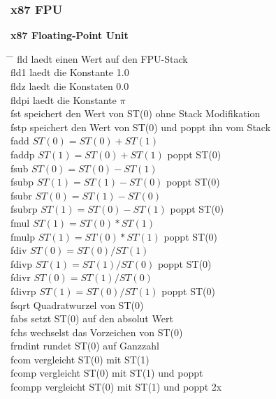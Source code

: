 \documentclass[a4paper,12pt,twoside]{article}
\begin{document}
\subsubsection{x87 FPU}
\textbf{x87 Floating-Point Unit}
\begin{tabbing}
  \hspace{2mm} \= \hspace{50mm} \= \kill
  \> fld \> laedt einen Wert auf den FPU-Stack \\ 
  \> fld1 \> laedt die Konstante 1.0 \\ 
  \> fldz \> laedt die Konstaten 0.0 \\ 
  \> fldpi \> laedt die Konstante $\pi$ \\ 
  \> fst \> speichert den Wert von ST(0) ohne Stack Modifikation \\ 
  \> fstp \> speichert den Wert von ST(0) und poppt ihn vom Stack \\
  \> fadd \> $ST(0) = ST(0) + ST(1)$ \\
  \> faddp \> $ST(1) = ST(0) + ST(1)$ poppt ST(0) \\ 
  \> fsub \> $ST(0) = ST(0) - ST(1)$ \\ 
  \> fsubp \> $ST(1) = ST(1) - ST(0)$ poppt ST(0) \\ 
  \> fsubr \> $ST(0) = ST(1) - ST(0)$ \\ 
  \> fsubrp \> $ST(1) = ST(0) - ST(1)$ poppt ST(0) \\ 
  \> fmul \> $ST(1) = ST(0) * ST(1)$ \\ 
  \> fmulp \>$ST(1) = ST(0) * ST(1)$ poppt ST(0) \\
  \> fdiv \> $ST(0) = ST(0) / ST(1)$ \\
  \> fdivp \> $ST(1) = ST(1) / ST(0)$ poppt ST(0) \\ 
  \> fdivr \> $ST(0) = ST(1) / ST(0)$ \\ 
  \> fdivrp \> $ST(1) = ST(0) / ST(1)$ poppt ST(0)\\ 
  \> fsqrt \> Quadratwurzel von ST(0) \\ 
  \> fabs \> setzt ST(0) auf den absolut Wert \\ 
  \> fchs \> wechselst das Vorzeichen von ST(0) \\ 
  \> frndint \> rundet ST(0) auf Ganzzahl \\ 
  \> fcom \> vergleicht ST(0) mit ST(1) \\ 
  \> fcomp \> vergleicht ST(0) mit ST(1) und poppt \\ 
  \> fcompp \> vergleicht ST(0) mit ST(1) und poppt 2x \\

\end{tabbing}
\end{document}
